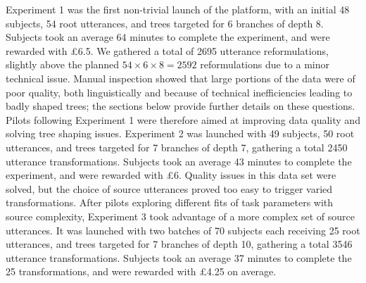 \documentclass[a4paper,fleqn]{cas-dc}
\begin{document}
Experiment 1 was the first non-trivial launch of the platform, with an
initial 48 subjects, 54 root utterances, and trees targeted for 6
branches of depth 8. Subjects took an average 64 minutes to complete the
experiment, and were rewarded with £6.5. We gathered a total of 2695 utterance reformulations, slightly above the planned \(54 \times 6 \times 8 = 2592\) reformulations due to a minor technical issue.
Manual inspection
showed that large portions of the data were of poor quality, both
linguistically and because of technical inefficiencies leading to badly
shaped trees; the sections below provide further details on these
questions. Pilots following Experiment 1 were therefore aimed at
improving data quality and solving tree shaping issues. Experiment 2 was
launched with 49 subjects, 50 root utterances, and trees targeted for 7
branches of depth 7, gathering a total 2450 utterance transformations.
Subjects took an average 43 minutes to complete the experiment, and were
rewarded with £6. Quality issues in this data set were solved, but the
choice of source utterances proved too easy to trigger varied
transformations. After pilots exploring different fits of task
parameters with source complexity, Experiment 3 took advantage of a more
complex set of source utterances. It was launched with two batches of 70
subjects each receiving 25 root utterances, and trees targeted for 7
branches of depth 10, gathering a total 3546 utterance transformations.
Subjects took an average 37 minutes to complete the 25 transformations,
and were rewarded with £4.25 on average.

\end{document}
